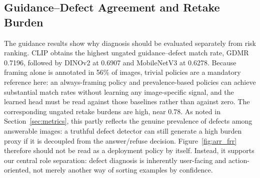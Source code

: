 \documentclass{ieeeaccess}
\newcommand{\arr}{\mathrm{GDMR}}
\newcommand{\clip}{CLIP}
\newcommand{\dinov}{DINOv2}
\newcommand{\mobilenet}{MobileNetV3}
\begin{document}
\subsection{Guidance--Defect Agreement and Retake Burden}
The guidance results show why diagnosis should be evaluated separately from risk ranking. \clip{} obtains the highest ungated guidance--defect match rate, $\arr$ 0.7196, followed by \dinov{} at 0.6907 and \mobilenet{} at 0.6278. Because framing alone is annotated in 56\% of images, trivial policies are a mandatory reference here: an always-framing policy and prevalence-based policies can achieve substantial match rates without learning any image-specific signal, and the learned head must be read against those baselines rather than against zero.
The corresponding ungated retake burdens are high, near 0.78. As noted in Section~\ref{sec:metrics}, this partly reflects the genuine prevalence of defects among answerable images: a truthful defect detector can still generate a high burden proxy if it is decoupled from the answer/refuse decision. Figure~\ref{fig:arr_frr} therefore should not be read as a deployment policy by itself. Instead, it supports our central role separation: defect diagnosis is inherently user-facing and action-oriented, not merely another way of sorting examples by confidence.
\end{document}
